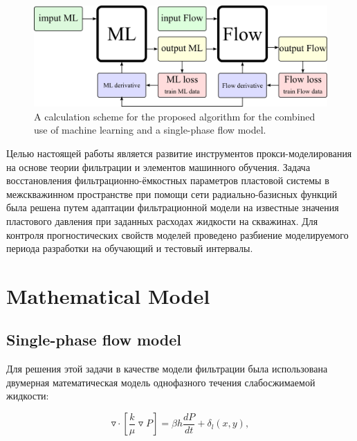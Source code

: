 \documentclass{article}
\begin{document}
\begin{figure}
	\centering
	\includegraphics[width=0.7\linewidth]{fig0}
	\caption{A calculation scheme for the proposed algorithm for the combined use of machine learning and a single-phase flow model.}
	\label{fig:schime1}
\end{figure}

Целью настоящей работы является развитие инструментов прокси-моделирования на основе теории фильтрации и элементов машинного обучения. Задача восстановления фильтрационно-ёмкостных параметров пластовой системы в межскважинном пространстве при помощи сети радиально-базисных функций была решена путем адаптации фильтрационной модели на известные значения пластового давления при заданных расходах жидкости на скважинах. Для контроля прогностических свойств моделей проведено разбиение моделируемого периода разработки на обучающий и тестовый интервалы.

\section{Mathematical Model}

\subsection{Single-phase flow model}
Для решения этой задачи в качестве модели фильтрации была использована двумерная математическая модель однофазного течения
слабосжимаемой жидкости:

\begin{equation} \label{fil}
	\triangledown \cdot \left[\frac{k}{\mu}\triangledown P \right] = \beta h\frac{dP}{dt} + \delta_{l}(x,y),
\end{equation}
\end{document}
